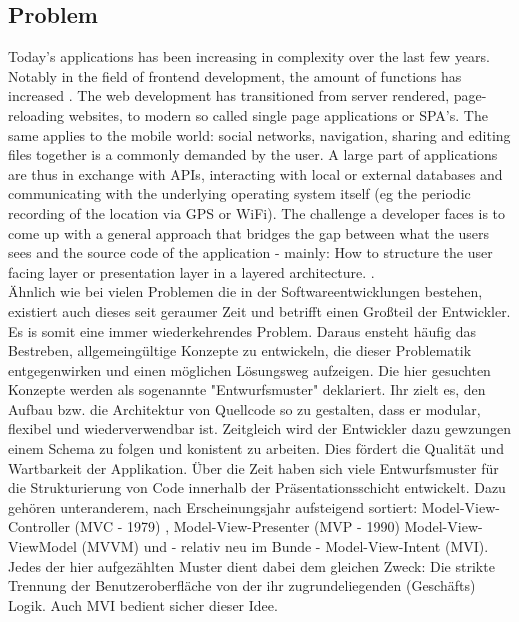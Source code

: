 \subsection{Problem}
\label{subsec:problem}

Today's applications has been increasing in complexity over the last few years.
Notably in the field of frontend development, the amount of functions has increased \cite{kevin2018}. The web development has transitioned from server rendered, 
page-reloading websites, to modern so called single page applications or SPA's.
The same applies to the mobile world: social networks, navigation, sharing and editing files together is a commonly demanded by the user.
A large part of applications are thus in exchange with APIs, interacting with local or external databases
and communicating with the underlying operating system itself (eg the periodic recording of the location via GPS or WiFi).
The challenge a developer faces is to come up with a general approach that bridges the gap between what the users sees and the source code of 
the application - mainly: How to structure the user facing layer or presentation layer in a layered architecture. \cite{guru99ntier,softwareArchitecturePatternsMark2015}. \\
Ähnlich wie bei vielen Problemen die in der Softwareentwicklungen bestehen, existiert auch dieses seit geraumer Zeit und betrifft einen Großteil der Entwickler. 
Es is somit eine immer wiederkehrendes Problem. Daraus ensteht häufig das Bestreben, allgemeingültige Konzepte zu entwickeln, die dieser Problematik entgegenwirken 
und einen möglichen Lösungsweg aufzeigen. Die hier gesuchten Konzepte werden als sogenannte "Entwurfsmuster" \cite{techterms2016design-pattern} deklariert. Ihr zielt es, den Aufbau bzw. 
die Architektur von Quellcode so zu gestalten, dass er modular, flexibel und
wiederverwendbar ist. Zeitgleich wird der Entwickler dazu gewzungen einem Schema zu folgen und konistent zu arbeiten. Dies fördert die Qualität und
Wartbarkeit der Applikation. Über die Zeit haben sich viele Entwurfsmuster für die Strukturierung von Code innerhalb der Präsentationsschicht entwickelt. 
Dazu gehören unteranderem, nach Erscheinungsjahr aufsteigend sortiert: Model-View-Controller (MVC - 1979) \cite{wikipediaMvc}, 
Model-View-Presenter (MVP - 1990) \cite{wikipediaMvp } Model-View-ViewModel (MVVM) \cite{blogMsdnMvvm} und - relativ 
neu im Bunde - Model-View-Intent (MVI). Jedes der hier aufgezählten Muster dient dabei dem gleichen Zweck: Die strikte Trennung der Benutzeroberfläche von der ihr 
zugrundeliegenden (Geschäfts) Logik. Auch MVI bedient sicher dieser Idee.
